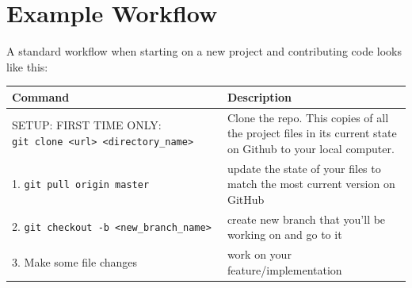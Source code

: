 \documentclass[]{book}
\begin{document}
\hypertarget{example-workflow}{%
\section{Example Workflow}\label{example-workflow}}

A standard workflow when starting on a new project and contributing code looks like this:

\begin{longtable}[]{@{}ll@{}}
\toprule
\begin{minipage}[b]{0.34\columnwidth}\raggedright
Command\strut
\end{minipage} & \begin{minipage}[b]{0.60\columnwidth}\raggedright
Description\strut
\end{minipage}\tabularnewline
\midrule
\endhead
\begin{minipage}[t]{0.34\columnwidth}\raggedright
SETUP: FIRST TIME ONLY: \texttt{git\ clone\ \textless{}url\textgreater{}\ \textless{}directory\_name\textgreater{}}\strut
\end{minipage} & \begin{minipage}[t]{0.60\columnwidth}\raggedright
Clone the repo. This copies of all the project files in its current state on Github to your local computer.\strut
\end{minipage}\tabularnewline
\begin{minipage}[t]{0.34\columnwidth}\raggedright
1. \texttt{git\ pull\ origin\ master}\strut
\end{minipage} & \begin{minipage}[t]{0.60\columnwidth}\raggedright
update the state of your files to match the most current version on GitHub\strut
\end{minipage}\tabularnewline
\begin{minipage}[t]{0.34\columnwidth}\raggedright
2. \texttt{git\ checkout\ -b\ \textless{}new\_branch\_name\textgreater{}}\strut
\end{minipage} & \begin{minipage}[t]{0.60\columnwidth}\raggedright
create new branch that you'll be working on and go to it\strut
\end{minipage}\tabularnewline
\begin{minipage}[t]{0.34\columnwidth}\raggedright
3. Make some file changes\strut
\end{minipage} & \begin{minipage}[t]{0.60\columnwidth}\raggedright
work on your feature/implementation\strut
\end{minipage}\tabularnewline

\end{longtable}
\end{document}
